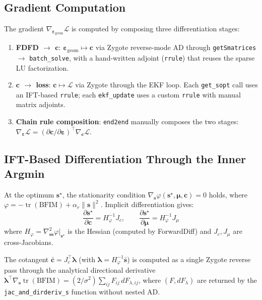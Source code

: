 \documentclass[11pt,a4paper]{article}
\newcommand{\tr}{\operatorname{tr}}
\begin{document}
\subsection{Gradient Computation}

The gradient $\nabla_{\bm{\varepsilon}_{\text{geom}}} \mathcal{L}$ is computed by composing three differentiation stages:

\begin{enumerate}[nosep]
  \item \textbf{FDFD $\to$ $\bm{c}$}: $\bm{\varepsilon}_{\text{geom}} \mapsto \bm{c}$ via Zygote reverse-mode AD through \texttt{getSmatrices} $\to$ \texttt{batch\_solve}, with a hand-written adjoint (\texttt{rrule}) that reuses the sparse LU factorization.

  \item \textbf{$\bm{c}$ $\to$ loss}: $\bm{c} \mapsto \mathcal{L}$ via Zygote through the EKF loop. Each \texttt{get\_sopt} call uses an IFT-based \texttt{rrule}; each \texttt{ekf\_update} uses a custom \texttt{rrule} with manual matrix adjoints.

  \item \textbf{Chain rule composition}: \texttt{end2end} manually composes the two stages: $\nabla_{\bm{\varepsilon}} \mathcal{L} = (\partial \bm{c} / \partial \bm{\varepsilon})^\top \nabla_{\bm{c}} \mathcal{L}$.
\end{enumerate}

\subsection{IFT-Based Differentiation Through the Inner Argmin}

At the optimum $\bm{s}^\star$, the stationarity condition $\nabla_{\bm{s}} \varphi(\bm{s}^\star, \bm{\mu}, \bm{c}) = 0$ holds, where $\varphi = -\tr(\text{BFIM}) + \alpha_r \|\bm{s}\|^2$.  Implicit differentiation gives:
\[
  \frac{\partial \bm{s}^\star}{\partial \bm{c}} = H_\varphi^{-1} J_c, \qquad
  \frac{\partial \bm{s}^\star}{\partial \bm{\mu}} = H_\varphi^{-1} J_\mu
\]
where $H_\varphi = \nabla^2_{\bm{ss}} \varphi|_{\bm{s}^\star}$ is the Hessian (computed by ForwardDiff) and $J_c, J_\mu$ are cross-Jacobians.

The cotangent $\bar{\bm{c}} = J_c^\top \bm{\lambda}$ (with $\bm{\lambda} = H_\varphi^{-1} \bar{\bm{s}}$) is computed as a single Zygote reverse pass through the analytical directional derivative $\bm{\lambda}^\top \nabla_{\bm{s}} \tr(\text{BFIM}) = (2/\sigma^2) \sum_{ij} F_{ij} \, dF_{\lambda,ij}$, where $(F, dF_\lambda)$ are returned by the \texttt{jac\_and\_dirderiv\_s} function without nested AD.
\end{document}
